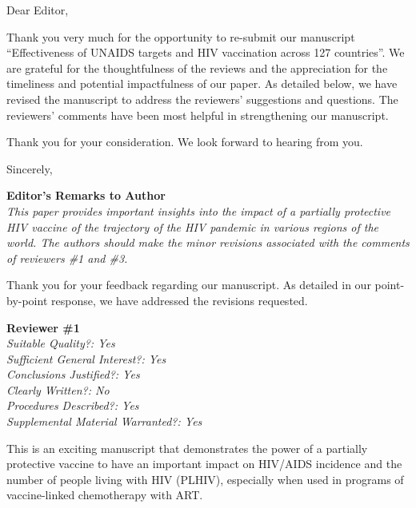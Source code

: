 \documentclass[12pt]{jpmletter}
\newcommand{\section}[1]{\textbf{#1}\\}
\newenvironment{original}{\it}{}
\begin{document}
  \begin{letter}{}

    \opening{Dear Editor,}
 
    Thank you very much for the opportunity to re-submit our
    manuscript ``Effectiveness of UNAIDS targets and HIV
    vaccination across 127 countries''. We are grateful for the
    thoughtfulness of the reviews and the appreciation for the
    timeliness and potential impactfulness of our paper. As detailed
    below, we have revised the manuscript to address the reviewers’
    suggestions and questions. The reviewers’ comments have been most
    helpful in strengthening our manuscript.
 
    Thank you for your consideration. We look forward to hearing from
    you.

    \closing{Sincerely,}

    \newpage

    \section{Editor's Remarks to Author}
    \begin{original}
      This paper provides important insights into the impact of
      a partially protective HIV vaccine of the trajectory of the HIV
      pandemic in various regions of the world. The authors should
      make the minor revisions associated with the comments of
      reviewers \#1 and \#3.
    \end{original}
    
    Thank you for your feedback regarding our manuscript. As detailed
    in our point-by-point response, we have addressed the revisions
    requested.

    \section{Reviewer \#1}
    \begin{original}
      Suitable Quality?: Yes\\
      Sufficient General Interest?: Yes\\
      Conclusions Justified?: Yes\\
      Clearly Written?: No\\
      Procedures Described?: Yes\\
      Supplemental Material Warranted?: Yes

      This is an exciting manuscript that demonstrates the power of a
      partially protective vaccine to have an important impact on
      HIV/AIDS incidence and the number of people living with HIV
      (PLHIV), especially when used in programs of vaccine-linked
      chemotherapy with ART.
    \end{original}
    

\end{letter}
\end{document}
